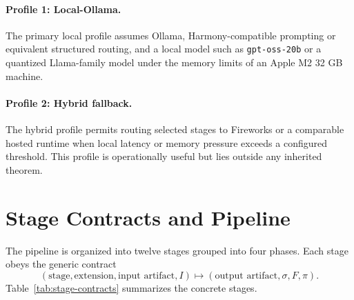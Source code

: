 \documentclass[11pt,a4paper,oneside]{article}
\begin{document}
\paragraph{Profile 1: Local-Ollama.}
The primary local profile assumes Ollama, Harmony-compatible prompting or equivalent structured routing, and a local model such as \texttt{gpt-oss-20b} or a quantized Llama-family model under the memory limits of an Apple M2 32 GB machine.

\paragraph{Profile 2: Hybrid fallback.}
The hybrid profile permits routing selected stages to Fireworks or a comparable hosted runtime when local latency or memory pressure exceeds a configured threshold. This profile is operationally useful but lies outside any inherited theorem.

\section{Stage Contracts and Pipeline}
The pipeline is organized into twelve stages grouped into four phases. Each stage obeys the generic contract
\[
(\text{stage},\text{extension},\text{input artifact},I) \mapsto (\text{output artifact},\sigma,F,\pi).
\]
Table~\ref{tab:stage-contracts} summarizes the concrete stages.
\end{document}
